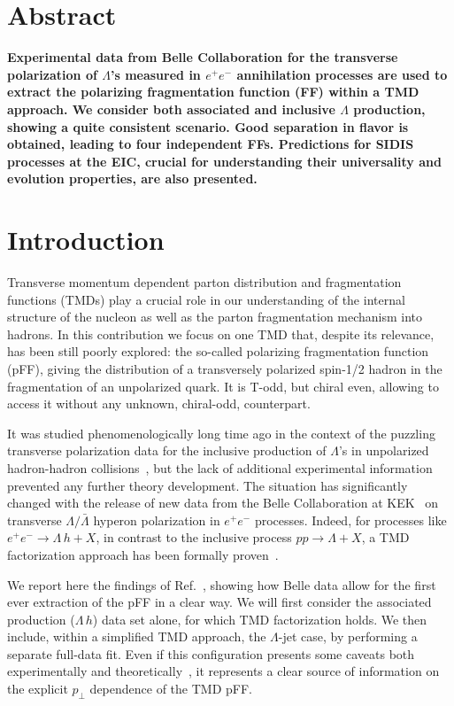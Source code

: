 \documentclass[submission, Proceedings]{SciPost}
\begin{document}
\section*{Abstract}
{\bf
Experimental data from Belle Collaboration for the transverse polarization of $\Lambda$'s measured in $e^+ e^-$ annihilation processes are used to extract the polarizing fragmentation function (FF) within a TMD approach.
We consider both associated and inclusive $\Lambda$ production, showing a quite consistent scenario. Good separation in flavor is obtained, leading to four independent FFs. Predictions for SIDIS processes at the EIC, crucial for understanding their universality and evolution properties, are also presented.
}

\section{Introduction}
\label{sec:intro}

Transverse momentum dependent parton distribution and fragmentation functions (TMDs) play a crucial role in our understanding of the internal structure of the nucleon as well as the parton fragmentation mechanism into hadrons. In this contribution we focus on one TMD that, despite its relevance, has been still poorly explored: the so-called polarizing fragmentation function (pFF), giving the distribution of a transversely polarized spin-1/2 hadron in the fragmentation of an unpolarized quark. It is T-odd, but chiral even, allowing to access it without any unknown, chiral-odd, counterpart.

It was studied phenomenologically long time ago in the context of the puzzling transverse polarization data for the inclusive production of $\Lambda$'s in unpolarized hadron-hadron collisions~\cite{Anselmino:2000vs}, but the lack of additional experimental information prevented any further theory development. The situation has significantly changed with the release of new data from the Belle Collaboration at KEK~\cite{Guan:2018ckx} on transverse $\Lambda/\bar\Lambda$ hyperon polarization in $e^+e^-$ processes. Indeed, for processes like $e^+e^-\to \Lambda\, h + X$, in contrast to the inclusive process $pp\to \Lambda + X$, a TMD factorization approach has been formally proven~\cite{Collins:2011zzd,GarciaEchevarria:2011rb}.

We report here the findings of Ref.~\cite{DAlesio:2020wjq}, showing how Belle data allow for the first ever extraction of the pFF in a clear way.
We will first consider the associated production ($\Lambda\,h$) data set alone, for which TMD factorization holds. We then include, within a simplified TMD approach, the $\Lambda$-jet case, by performing a separate full-data fit. Even if this configuration presents some caveats both experimentally and theoretically~\cite{Kang:2020yqw,Boglione:2020auc}, it represents a clear source of information on the explicit $p_\perp$ dependence of the TMD pFF.
\end{document}
